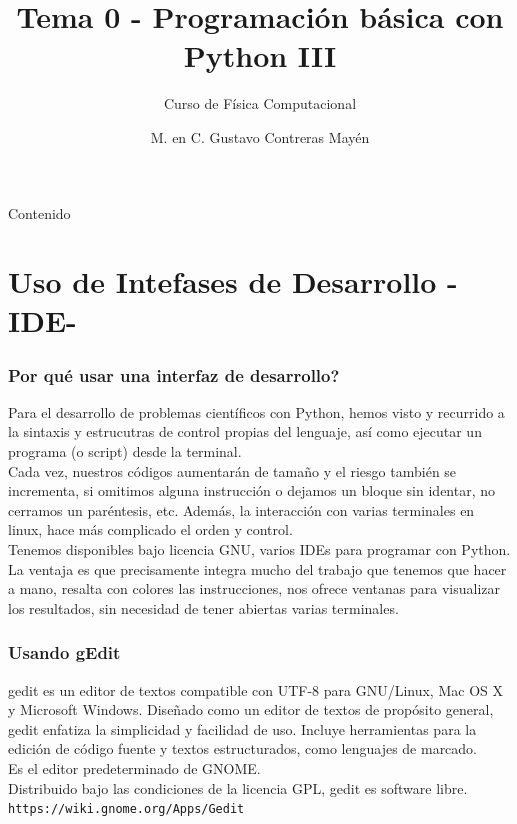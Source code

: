 

\title{Tema 0 - Programación básica con Python III}
\subtitle{Curso de Física Computacional}
\author[]{M. en C. Gustavo Contreras Mayén}
\date{}

\maketitle
\fontsize{12}{12}\selectfont
{}
\begin{frame}{Contenido}
\tableofcontents[pausesections]
\end{frame}
\section{Uso de Intefases de Desarrollo -IDE-}
\begin{frame}
\frametitle{Por qué usar una interfaz de desarrollo?}
Para el desarrollo de problemas científicos con Python, hemos visto y recurrido a la sintaxis y estrucutras de control propias del lenguaje, así como ejecutar un programa (o script) desde la terminal.
\\
\medskip
Cada vez, nuestros códigos aumentarán de tamaño y el riesgo también se incrementa, si omitimos alguna instrucción o dejamos un bloque sin identar, no cerramos un paréntesis, etc. Además, la interacción con varias terminales en linux, hace más complicado el orden y control.
\\
\medskip
Tenemos disponibles bajo licencia GNU, varios IDEs para programar con Python. La ventaja es que precisamente integra mucho del trabajo que tenemos que hacer a mano, resalta con colores las instrucciones, nos ofrece ventanas para visualizar los resultados, sin necesidad de tener abiertas varias terminales.
\end{frame}
\begin{frame}
\frametitle{Usando gEdit}
gedit es un editor de textos compatible con UTF-8 para GNU/Linux, Mac OS X y Microsoft Windows. Diseñado como un editor de textos de propósito general, gedit enfatiza la simplicidad y  facilidad de uso. Incluye herramientas para la edición de código fuente y textos estructurados, como lenguajes de marcado.
\\
\medskip
Es el editor predeterminado de GNOME.
\\
\medskip
Distribuido bajo las condiciones de la licencia GPL, gedit es software libre.\\
\medskip
\texttt{https://wiki.gnome.org/Apps/Gedit}
\end{frame}

